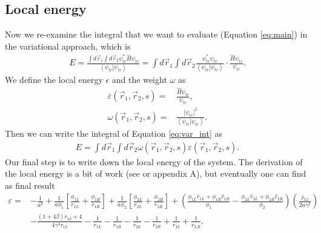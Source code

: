 \subsection{Local energy}
Now we re-examine the integral that we want to evaluate (Equation \ref{eq:main}) in the variational approach, which is
\begin{align}
E = \frac{{\int {d{{\vec r}_1}\int {d{{\vec r}_2}} {\psi_{tr} ^ * }\hat H\psi_{tr} } }}{{\left\langle \psi_{tr}  \right|\left. \psi_{tr}  \right\rangle }} = \int {d{{\vec r}_1}\int {d{{\vec r}_2}} \frac{{{\psi_{tr} ^ * }\psi_{tr} }}{{\left\langle \psi_{tr}  \right|\left. \psi_{tr}  \right\rangle }} \cdot \frac{{\hat H\psi_{tr} }}{\psi_{tr} }}
\label{eq:var_int}.
\end{align}
We define the local energy $\epsilon$ and the weight $\omega$ as
\begin{align}
\varepsilon \left( {{{\vec r}_1},{{\vec r}_2},s} \right) =& \frac{{\hat H\psi_{tr} }}{\psi_{tr} },\\
\omega \left( {{{\vec r}_1},{{\vec r}_2},s} \right) =& \frac{{{{\left| \psi_{tr}  \right|}^2}}}{{\left\langle \psi_{tr}  \right|\left. \psi_{tr}  \right\rangle }}.
\end{align}
Then we can write the integral of Equation \ref{eq:var_int} as 
\begin{align}
E = \int {d{{\vec r}_1}\int {d{{\vec r}_2}} \omega \left( {{{\vec r}_1},{{\vec r}_2},s} \right)\varepsilon \left( {{{\vec r}_1},{{\vec r}_2},s} \right)}.
\end{align}
Our final step is to write down the local energy of the system. The derivation of the local energy is a bit of work (see \cite{MSU_paper} or appendix A), but eventually one can find as final result
\begin{align}
\varepsilon  =&  - \frac{1}{{{a^2}}} + \frac{1}{{a{\phi _1}}}\left[ {\frac{{{\phi _{1L}}}}{{{r_{1L}}}} + \frac{{{\phi _{1R}}}}{{{r_{1R}}}}} \right] + \frac{1}{{a{\phi _2}}}\left[ {\frac{{{\phi _{2L}}}}{{{r_{2L}}}} + \frac{{{\phi _{2R}}}}{{{r_{2R}}}}} \right] + \left( {\frac{{{\phi _{1L}}{{\hat r}_{1L}} + {\phi _{1R}}{{\hat r}_{1R}}}}{{{\phi _1}}} - \frac{{{\phi _{2L}}{{\hat r}_{2L}} + {\phi _{2R}}{{\hat r}_{2R}}}}{{{\phi _2}}}} \right)\left( {\frac{{{{\hat r}_{12}}}}{{2a{\gamma ^2}}}} \right)\nonumber\\
 &- \frac{{\left( {1 + 4\beta } \right){r_{12}} + 4}}{{4{\gamma ^4}{r_{12}}}} - \frac{1}{{{r_{1L}}}} - \frac{1}{{{r_{1R}}}} - \frac{1}{{{r_{2L}}}} - \frac{1}{{{r_{2R}}}} + \frac{1}{{{r_{12}}}} + \frac{1}{{{r_{LR}}}}.
\end{align}
